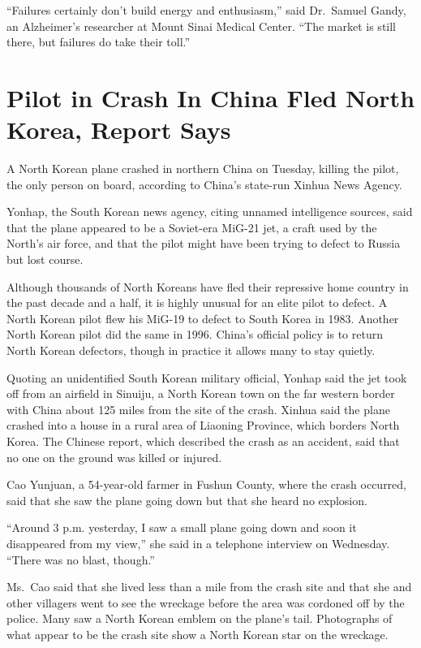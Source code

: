 ﻿\documentclass[12pt]{article}
\begin{document}
``Failures certainly don't build energy and enthusiasm,'' said Dr.~Samuel Gandy, an Alzheimer's
researcher at Mount Sinai Medical Center. ``The market is still there, but failures do take their
toll.''

\section{Pilot in Crash In China Fled North Korea, Report Says}

\lettrine{A}{} North Korean plane crashed in northern China on Tuesday,
killing the pilot, the only person on board, according to China's state-run Xinhua News Agency.

Yonhap, the South Korean news agency, citing unnamed intelligence sources, said that the plane
appeared to be a Soviet-era MiG-21 jet, a craft used by the North's air force, and that the pilot
might have been trying to defect to Russia but lost course.

Although thousands of North Koreans have fled their repressive home country in the past decade and a
half, it is highly unusual for an elite pilot to defect. A North Korean pilot flew his MiG-19 to
defect to South Korea in 1983. Another North Korean pilot did the same in 1996. China's official
policy is to return North Korean defectors, though in practice it allows many to stay quietly.

Quoting an unidentified South Korean military official, Yonhap said the jet took off from an
airfield in Sinuiju, a North Korean town on the far western border with China about 125 miles from
the site of the crash. Xinhua said the plane crashed into a house in a rural area of Liaoning
Province, which borders North Korea. The Chinese report, which described the crash as an accident,
said that no one on the ground was killed or injured.

Cao Yunjuan, a 54-year-old farmer in Fushun County, where the crash occurred, said that she saw the
plane going down but that she heard no explosion.

``Around 3 p.m. yesterday, I saw a small plane going down and soon it disappeared from my view,''
she said in a telephone interview on Wednesday. ``There was no blast, though.''

Ms.~Cao said that she lived less than a mile from the crash site and that she and other villagers
went to see the wreckage before the area was cordoned off by the police. Many saw a North Korean
emblem on the plane's tail. Photographs of what appear to be the crash site show a North Korean star
on the wreckage.
\end{document}
